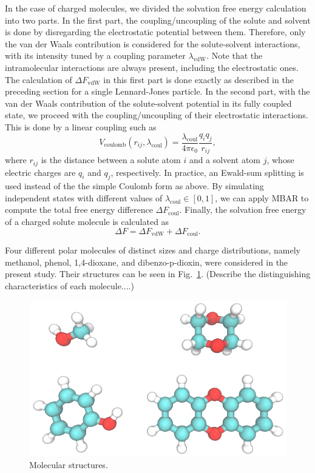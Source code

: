 \documentclass[
aip,
jcp,
reprint,
]{revtex4-1}
\begin{document}
In the case of charged molecules, we divided the solvation free energy calculation into two parts.
In the first part, the coupling/uncoupling of the solute and solvent is done by disregarding the electrostatic potential between them.
Therefore, only the van der Waals contribution is considered for the solute-solvent interactions, with its intensity tuned by a coupling parameter $\lambda_\mathrm{vdW}$.
Note that the intramolecular interactions are always present, including the electrostatic ones.
The calculation of $\Delta F_\mathrm{vdW}$ in this first part is done exactly as described in the preceding section for a single Lennard-Jones particle.
In the second part, with the van der Waals contribution of the solute-solvent potential in its fully coupled state, we proceed with the coupling/uncoupling of their electrostatic interactions.
This is done by a linear coupling such as
\begin{equation*}
V_\mathrm{coulomb}(r_{ij},\lambda_\mathrm{coul}) = \frac{\lambda_\mathrm{coul}}{4 \pi \epsilon_0} \frac{q_i q_j}{r_{ij}},
\end{equation*}
where $r_{ij}$ is the distance between a solute atom $i$ and a solvent atom $j$, whose electric charges are $q_i$ and $q_j$, respectively.
In practice, an Ewald-sum splitting is used instead of the the simple Coulomb form as above.
By simulating independent states with different values of $\lambda_\mathrm{coul} \in [0, 1]$, we can apply MBAR to compute the total free energy difference $\Delta F_\mathrm{coul}$.
Finally, the solvation free energy of a charged solute molecule is calculated as
\begin{equation}
\Delta F = \Delta F_\mathrm{vdW} + \Delta F_\mathrm{coul}.
\end{equation}

Four different polar molecules of distinct sizes and charge distributions, namely methanol, phenol, 1,4-dioxane, and dibenzo-p-dioxin, were considered in the present study.
Their structures can be seen in Fig.~\ref{fig:molecular structures}.
(Describe the distinguishing characteristics of each molecule....)

\begin{figure}
	\centering
	\includegraphics[width=\linewidth]{molecular_structures}
	\caption{Molecular structures.}
	\label{fig:molecular structures}
\end{figure}
\end{document}
